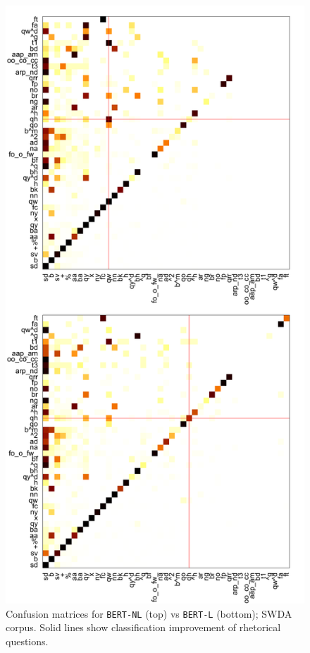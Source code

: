 \documentclass[11pt,a4paper]{article}
\begin{document}
  \begin{figure}
  \centering
    \fontsize{6}{10}\selectfont
%      
   \includegraphics[width=\linewidth]{img/swda-cm.pdf}
  \caption{Confusion matrices for \texttt{BERT-NL} (top) vs \texttt{BERT-L} (bottom); SWDA corpus. Solid lines show classification improvement  of rhetorical questions.}
    \label{fig:swda-cm}
  \end{figure}
\end{document}
